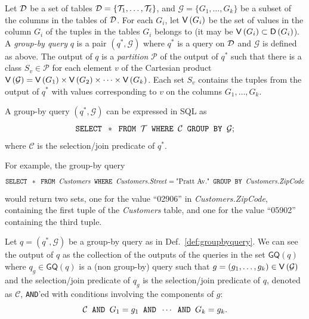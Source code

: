 \begin{definition}\label{def:groupbyquery}
  Let ${\cal D}$ be a set of tables ${\cal D}=\{{\cal T}_1,\dotsc,{\cal T}_\ell\}$, and
  $\mathcal{G}=\{G_1,\dotsc,G_k\}$ be a subset of the columns in the tables of ${\cal D}$. For
  each $G_i$, let $\mathsf{V}\left(G_i\right)$ be the set of values in the column
  $G_i$ of the tuples in the tables $G_i$ belongs to (it may be $\mathsf{V}\left(G_i\right)\subset
  \mathsf{D}\left(G_i\right)$). A \emph{group-by query} $q$ is a pair $(q^*,\mathcal{G})$ where $q^*$ is a query
  on ${\cal D}$ and $\mathcal{G}$ is defined as above.  The output of $q$ is a
  \emph{partition} $\mathcal{P}$ of the output of $q^*$ such that there is a
  class $S_v\in\mathcal{P}$ for each element $v$ of the Cartesian product
  $\mathsf{V}\left(\mathcal{G}\right)=\mathsf{V}\left(G_1\right)\times \mathsf{V}\left(G_2\right)\times\dotsb\times
  \mathsf{V}\left(G_k\right)$. Each set $S_v$ contains the tuples from the output of $q^*$
  with values corresponding to $v$ on the columns $G_1,\dotsc,G_k$.

  A group-by query $(q^*,\mathcal{G})$ can be expressed in SQL as
  \[
  \text{\texttt{SELECT }} * \text{\texttt{ FROM }} {\cal T} \text{\texttt{ WHERE }} \mathcal{C} \text{\texttt{ GROUP BY }} \mathcal{G};
   \]
  where $\mathcal{C}$ is the selection/join predicate of $q^*$.
\end{definition}
For example, the group-by query
\[
\text{\texttt{SELECT }} * \text{\texttt{ FROM }} \text{\emph{Customers}}  \text{\texttt{ WHERE }} \text{\emph{Customers.Street}} =
\text{"Pratt Av."} \text{\texttt{ GROUP BY }} \text{\emph{Customers.ZipCode}}
\]
would return two sets, one for the value ``02906'' in \emph{Customers.ZipCode},
containing the first tuple of the \emph{Customers}
table, and one for the value ``05902'' containing the third tuple.

\begin{fact}\label{fact:groupbyequiv}
  Let $q=(q^*,\mathcal{G})$ be a group-by query as in Def.~\ref{def:groupbyquery}. 
  We can see the output of $q$ as the collection of the outputs of the queries
  in the set $\mathsf{GQ}(q)$ where $q_g\in \mathsf{GQ}(q)$ is a (non group-by)
  query such that $g=(g_1,\dotsc,g_k)\in \mathsf{V}\left(\mathcal{G}\right)$ and the
  selection/join predicate of $q_g$ is the selection/join predicate of $q$,
  denoted as $\mathcal{C}$, \texttt{AND}'ed with conditions involving the
  components of $g$:
  \begin{equation}\label{eq:groupbyequiv}
    \mathcal{C} \text{\texttt{ AND }} G_1=g_1 \text{\texttt{ AND }} \dotsb \text{\texttt{ AND }} G_k=g_k.
  \end{equation}
\end{fact}

